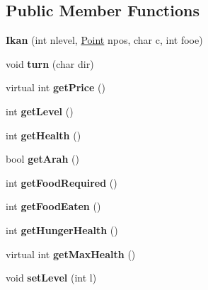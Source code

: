 \subsection*{Public Member Functions}
\begin{DoxyCompactItemize}
\item 
\mbox{\label{class_ikan_ad11c2d630dff6f3d9a1129029655f2b4}} 
{\bfseries Ikan} (int nlevel, \mbox{\hyperlink{class_point}{Point}} npos, char c, int fooe)
\item 
\mbox{\label{class_ikan_a69070048af8a005276c98a8cd6755edd}} 
void {\bfseries turn} (char dir)
\item 
\mbox{\label{class_ikan_a58a414cb234c8ce3dfca59831baaa7a9}} 
virtual int {\bfseries get\+Price} ()
\item 
\mbox{\label{class_ikan_ae8e8d10470b73a766aa103469a4c9ab6}} 
int {\bfseries get\+Level} ()
\item 
\mbox{\label{class_ikan_a03979ad7be7753ac795360fda22b6c9f}} 
int {\bfseries get\+Health} ()
\item 
\mbox{\label{class_ikan_a2059bbceb47a3a2e25013f68aa657f14}} 
bool {\bfseries get\+Arah} ()
\item 
\mbox{\label{class_ikan_a6018ad3686c28f158e345fa8a8cc96fd}} 
int {\bfseries get\+Food\+Required} ()
\item 
\mbox{\label{class_ikan_ac10bd9b8648a4ba070f91a7048b91094}} 
int {\bfseries get\+Food\+Eaten} ()
\item 
\mbox{\label{class_ikan_abb156038baed8a17815dcab87cc9d93e}} 
int {\bfseries get\+Hunger\+Health} ()
\item 
\mbox{\label{class_ikan_ac39d66a7e5548dfa1798566165671d91}} 
virtual int {\bfseries get\+Max\+Health} ()
\item 
\mbox{\label{class_ikan_a4ac1a7389722b0d90cdea084eeae0a96}} 
void {\bfseries set\+Level} (int l)
\item 
\mbox{\label{class_ikan_ab6ebf8765c816c2fcad976dea7a28fa1}} 

\end{DoxyCompactItemize}
